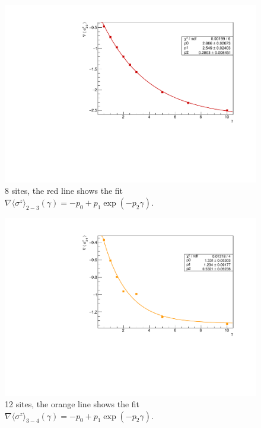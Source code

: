 \begin{figure}[H]
    \centering
    \includegraphics[scale=0.7]{Figures/8sites/FIT_8sites_gradLM23VSgamma.pdf}
    \caption{8 sites, the red line shows the fit \\$\nabla \langle\sigma^z\rangle_{2-3}(\gamma) = -p_0+p_1\exp{(-p_2\gamma)}$.}
    \label{fig:FIT_8sites_gradLM23VSgamma}
\end{figure}

\begin{figure}[H]
    \centering
    \includegraphics[scale=0.7]{Figures/12sites/FIT_12sites_gradLM34VSgamma.pdf}
    \caption{12 sites, the orange line shows the fit \\$\nabla \langle\sigma^z\rangle_{3-4}(\gamma) = -p_0+p_1\exp{(-p_2\gamma)}$.}
    \label{fig:FIT_12sites_gradLM34VSgamma}
\end{figure}

